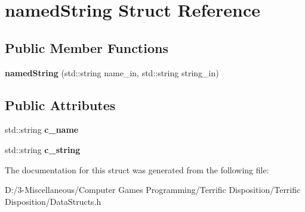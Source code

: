 \hypertarget{structnamed_string}{}\section{named\+String Struct Reference}
\label{structnamed_string}
\subsection*{Public Member Functions}
\begin{DoxyCompactItemize}
\item 
\mbox{\label{structnamed_string_a9ea61e3955e63cbea5cb2e7a1f9558f6}} 
{\bfseries named\+String} (std\+::string name\+\_\+in, std\+::string string\+\_\+in)
\end{DoxyCompactItemize}
\subsection*{Public Attributes}
\begin{DoxyCompactItemize}
\item 
\mbox{\label{structnamed_string_af5c10fc23afb8dfc3edd912ad78d5b10}} 
std\+::string {\bfseries c\+\_\+name}
\item 
\mbox{\label{structnamed_string_a41b9ccf6b8f6d67f04ddffae37b6d428}} 
std\+::string {\bfseries c\+\_\+string}
\end{DoxyCompactItemize}


The documentation for this struct was generated from the following file\+:\begin{DoxyCompactItemize}
\item 
D\+:/3-\/\+Miscellaneous/\+Computer Games Programming/\+Terrific Disposition/\+Terrific Disposition/Data\+Structs.\+h\end{DoxyCompactItemize}
